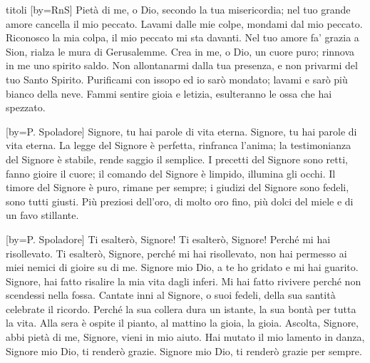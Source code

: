 \begin{songs}{titoli}
[by={RnS}]
\beginverse
Pietà di me, o Dio, secondo la tua misericordia;
nel tuo grande amore cancella il mio peccato.
Lavami dalle mie colpe, mondami dal mio peccato.
Riconosco la mia colpa, il mio peccato mi sta davanti.
\endverse
\beginchorus
Nel tuo amore fa' grazia a Sion, rialza le mura di Gerusalemme. 
\endchorus
\beginverse
Crea in me, o Dio, un cuore puro;
rinnova in me uno spirito saldo.
Non allontanarmi dalla tua presenza,
e non privarmi del tuo Santo Spirito.
\endverse
\beginverse
Purificami con issopo ed io sarò mondato;
lavami e sarò più bianco della neve.
Fammi sentire gioia e letizia,
esulteranno le ossa che hai spezzato.
\endverse
\endsong

[by={P. Spoladore}]
\beginchorus
Signore, tu hai parole di vita eterna.
Signore, tu hai parole di vita eterna.
\endchorus
\beginverse
La legge del Signore è perfetta,
rinfranca l'anima;
la testimonianza del Signore è stabile,
rende saggio il semplice.
\endverse
\beginverse
I precetti del Signore sono retti,
fanno gioire il cuore;
il comando del Signore è limpido,
illumina gli occhi.
\endverse
\beginverse
Il timore del Signore è puro,
rimane per sempre;
i giudizi del Signore sono fedeli,
sono tutti giusti.
\endverse
\beginverse
Più preziosi dell'oro,
di molto oro fino,
più dolci del miele
e di un favo stillante.
\endverse
\endsong

[by={P. Spoladore}]
\beginchorus
Ti esalterò, Signore! Ti esalterò, Signore! 
Perché mi hai risollevato. 
\endchorus
\beginverse
Ti esalterò, Signore, perché mi hai risollevato,
non hai permesso ai miei nemici di gioire su di me.
Signore mio Dio, a te ho gridato e mi hai guarito.
Signore, hai fatto risalire la mia vita dagli inferi.
Mi hai fatto rivivere perché non scendessi nella fossa.
\endverse
\beginverse
Cantate inni al Signore, o suoi fedeli,
della sua santità celebrate il ricordo.
Perché la sua collera dura un istante,
la sua bontà per tutta la vita.
Alla sera è ospite il pianto, al mattino la gioia, la gioia.
\endverse
\beginverse
Ascolta, Signore, abbi pietà di me,
Signore, vieni in mio aiuto.
Hai mutato il mio lamento in danza,
Signore mio Dio, ti renderò grazie.
Signore mio Dio, ti renderò grazie per sempre.
\endverse
\endsong


\end{songs}
